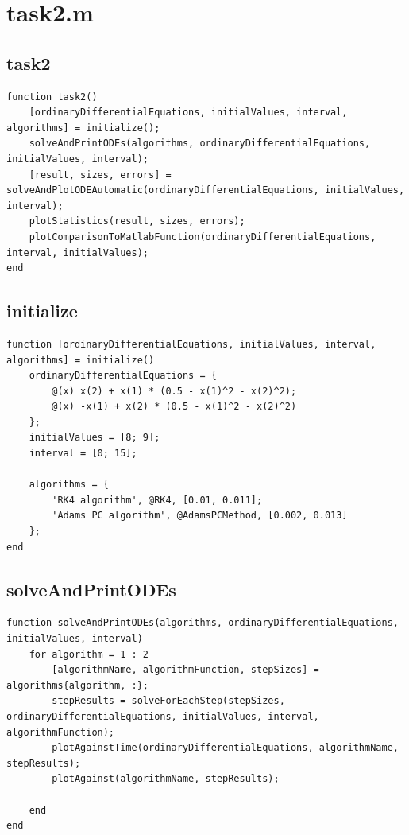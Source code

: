 \section{task2.m}
\subsection{task2}
\begin{simplechar}
\begin{lstlisting}
function task2()
    [ordinaryDifferentialEquations, initialValues, interval, algorithms] = initialize();
    solveAndPrintODEs(algorithms, ordinaryDifferentialEquations, initialValues, interval);
    [result, sizes, errors] = solveAndPlotODEAutomatic(ordinaryDifferentialEquations, initialValues, interval);
    plotStatistics(result, sizes, errors);
    plotComparisonToMatlabFunction(ordinaryDifferentialEquations, interval, initialValues);
end
\end{lstlisting}
\end{simplechar}

\subsection{initialize}
\begin{simplechar}
\begin{lstlisting}
function [ordinaryDifferentialEquations, initialValues, interval, algorithms] = initialize()
    ordinaryDifferentialEquations = {
        @(x) x(2) + x(1) * (0.5 - x(1)^2 - x(2)^2);
        @(x) -x(1) + x(2) * (0.5 - x(1)^2 - x(2)^2)
    };
    initialValues = [8; 9];
    interval = [0; 15];

    algorithms = {
        'RK4 algorithm', @RK4, [0.01, 0.011];
        'Adams PC algorithm', @AdamsPCMethod, [0.002, 0.013]
    };
end
\end{lstlisting}
\end{simplechar}

\subsection{solveAndPrintODEs}
\begin{simplechar}
\begin{lstlisting}
function solveAndPrintODEs(algorithms, ordinaryDifferentialEquations, initialValues, interval)
    for algorithm = 1 : 2
        [algorithmName, algorithmFunction, stepSizes] = algorithms{algorithm, :};
        stepResults = solveForEachStep(stepSizes, ordinaryDifferentialEquations, initialValues, interval, algorithmFunction);
        plotAgainstTime(ordinaryDifferentialEquations, algorithmName, stepResults);
        plotAgainst(algorithmName, stepResults);

    end
end
\end{lstlisting}
\end{simplechar}

